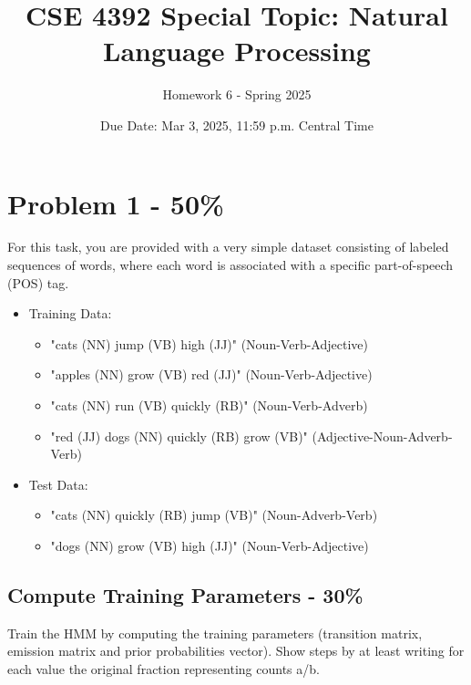 \documentclass{article}
\newcommand{\answerboxbig}{
    \vspace{20cm} %
}
\begin{document}
\title{CSE 4392 Special Topic: Natural Language Processing}
\author{Homework 6 - Spring 2025}
\date{Due Date: Mar 3, 2025, 11:59 p.m. Central Time}
\maketitle
\thispagestyle{fancy}


\section*{Problem 1 - 50\%}

For this task, you are provided with a very simple dataset consisting of labeled sequences of words, 
where each word is associated with a specific part-of-speech (POS) tag. 

\begin{itemize}
    \item Training Data:
    \begin{itemize}
        \item "cats (NN) jump (VB) high (JJ)" (Noun-Verb-Adjective)  
        \item "apples (NN) grow (VB) red (JJ)" (Noun-Verb-Adjective)  
        \item "cats (NN) run (VB) quickly (RB)" (Noun-Verb-Adverb)  
        \item "red (JJ) dogs (NN) quickly (RB) grow (VB)" (Adjective-Noun-Adverb-Verb)  
    \end{itemize}
    
    \item Test Data:
    \begin{itemize}
        \item "cats (NN) quickly (RB) jump (VB)" (Noun-Adverb-Verb)  
        \item "dogs (NN) grow (VB) high (JJ)" (Noun-Verb-Adjective)  
    \end{itemize}
\end{itemize}

\answerboxbig


\subsection*{Compute Training Parameters - 30\%}
Train the HMM by computing the training parameters (transition matrix, emission matrix and prior probabilities vector). Show steps by at least writing for each value the original fraction representing counts a/b.
\answerboxbig
\end{document}
